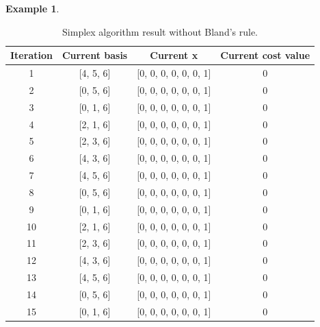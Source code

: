 \documentclass[a4paper,10 pt,titlepage,twoside]{book}
\theoremstyle{plain}
\theoremstyle{definition}
\newtheorem{ex}[thm]{Example}
\theoremstyle{remark}
\begin{document}
\begin{ex}
\begin{table}[h]
	\begin{center}
	\begin{tabular}{cccc}
		\hline
		\textbf{Iteration} & \textbf{Current basis} & \textbf{Current x} & \textbf{Current cost value} \\ \hline
		1 & [4, 5, 6] & [0, 0, 0, 0, 0, 0, 1] & 0 \\
		2 & [0, 5, 6] & [0, 0, 0, 0, 0, 0, 1] & 0 \\
		3 & [0, 1, 6] & [0, 0, 0, 0, 0, 0, 1] & 0 \\ 
		4 & [2, 1, 6] & [0, 0, 0, 0, 0, 0, 1] & 0 \\
		5 & [2, 3, 6] & [0, 0, 0, 0, 0, 0, 1] & 0 \\
		6 & [4, 3, 6] & [0, 0, 0, 0, 0, 0, 1] & 0 \\
		7 & [4, 5, 6] & [0, 0, 0, 0, 0, 0, 1] & 0 \\
		8 & [0, 5, 6] & [0, 0, 0, 0, 0, 0, 1] & 0 \\
		9 & [0, 1, 6] & [0, 0, 0, 0, 0, 0, 1] & 0 \\
		10 & [2, 1, 6] & [0, 0, 0, 0, 0, 0, 1] & 0 \\
		11 & [2, 3, 6] & [0, 0, 0, 0, 0, 0, 1] & 0 \\ 
		12 & [4, 3, 6] & [0, 0, 0, 0, 0, 0, 1] & 0 \\
		13 & [4, 5, 6] & [0, 0, 0, 0, 0, 0, 1] & 0 \\
		14 & [0, 5, 6] & [0, 0, 0, 0, 0, 0, 1] & 0 \\
		15 & [0, 1, 6] & [0, 0, 0, 0, 0, 0, 1] & 0 \\ \hline
	\end{tabular}\caption{Simplex algorithm result without Bland's rule.}
\end{center}
\end{table}
\end{ex} 
\end{document}
